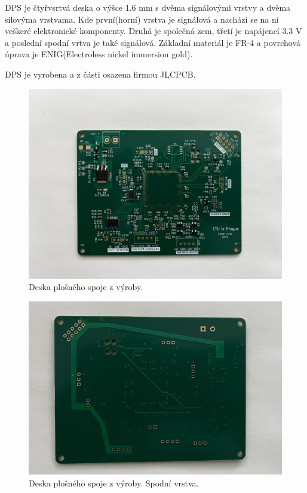 DPS je čtyřvsrtvá deska o výšce 1.6 mm s dvěma signálovými vrstvy a dvěma silovýma vrstvama. Kde první(horní) vrstva je signálová a nachází se na ní veškeré elektronické komponenty. Druhá je společná zem, třetí je napájencí 3.3 V a poslední spodní vrtva je také signálová.
Základní materiál je FR-4 a povrchová úprava je ENIG(Electroless nickel immersion gold).
\par
DPS je vyrobena a z části osazena firmou JLCPCB.
\begin{figure}[H]
    \includegraphics[width=0.9\linewidth]{pictures/pcb_from_production.jpg}
    \caption{Deska plošného spoje z výroby.}
    \label{fig:pcb_production}
\end{figure}
\begin{figure}[H]
    \includegraphics[width=0.9\linewidth]{pictures/pcb_production_bottom.jpg}
    \caption{Deska plošného spoje z výroby. Spodní vrstva.}
    \label{fig:pcb_production_bottom}
\end{figure}

